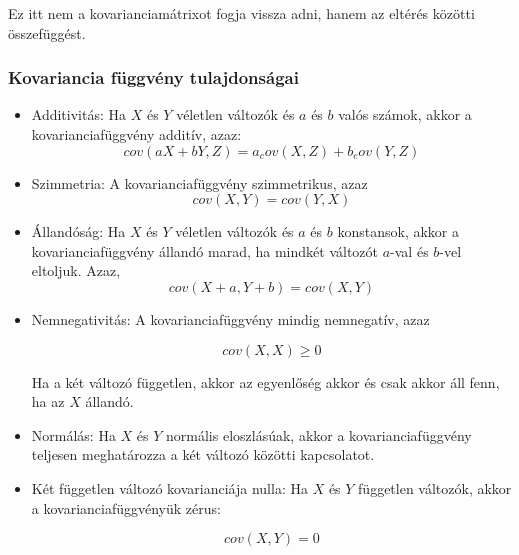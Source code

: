 \documentclass[11pt,a4pape,draftr]{article}
\begin{document}
				Ez itt nem a kovarianciamátrixot fogja vissza adni, hanem az eltérés közötti összefüggést.
				\subsubsection{Kovariancia függvény tulajdonságai}
					\begin{itemize}
					\item Additivitás: Ha $X$ és $Y$ véletlen változók és $a$ és $b$ valós számok, akkor a kovarianciafüggvény additív, azaz:
					$$cov(aX + bY, Z) = a_cov(X, Z) + b_cov(Y, Z)$$
					
					\item Szimmetria: A kovarianciafüggvény szimmetrikus, azaz
					$$cov(X,Y) = cov(Y,X)$$
					
					\item Állandóság: Ha $X$ és $Y$ véletlen változók és $a$ és $b$ konstansok, akkor a kovarianciafüggvény állandó marad, ha mindkét változót $a$-val és $b$-vel eltoljuk. Azaz,
					$$cov(X + a, Y + b) = cov(X, Y)$$
					
					\item Nemnegativitás: A kovarianciafüggvény mindig nemnegatív, azaz
					
					$$cov(X, X) \ge 0$$
					
					Ha a két változó független, akkor az egyenlőség akkor és csak akkor áll fenn, ha az $X$ állandó.
					
					\item Normálás: Ha $X$ és $Y$ normális eloszlásúak, akkor a kovarianciafüggvény teljesen meghatározza a két változó közötti kapcsolatot.
					
					\item Két független változó kovarianciája nulla: Ha $X$ és $Y$ független változók, akkor a kovarianciafüggvényük zérus:
					
					$$cov(X, Y) = 0$$
					\end{itemize}
\end{document}
